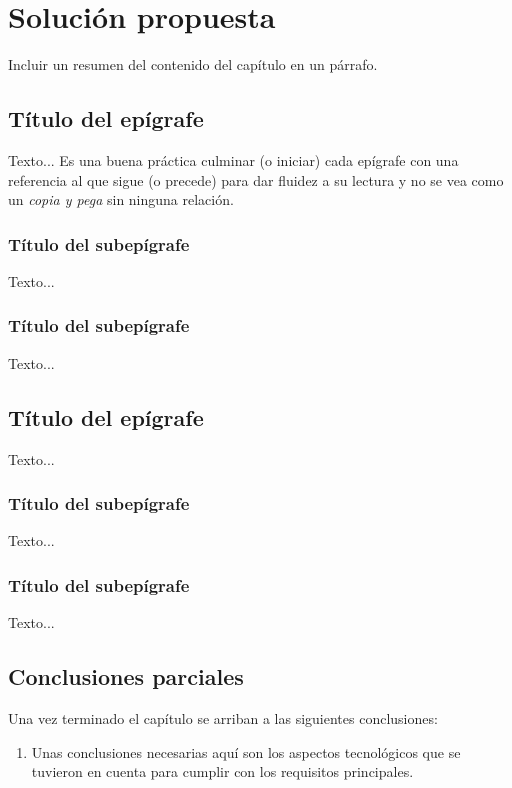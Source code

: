 \chapter{Solución propuesta}\label{chap:2}

Incluir un resumen del contenido del capítulo en un párrafo.\\

\section{Título del epígrafe}

Texto... Es una buena práctica culminar (o iniciar) cada epígrafe con una referencia al que sigue (o precede) para dar fluidez a su lectura y no se vea como un \emph{copia y pega} sin ninguna relación.

\subsection{Título del subepígrafe}

Texto...

\subsection{Título del subepígrafe}

Texto...

\section{Título del epígrafe}

Texto...

\subsection{Título del subepígrafe}

Texto...

\subsection{Título del subepígrafe}

Texto...

\section{Conclusiones parciales}


Una vez terminado el capítulo se arriban a las siguientes conclusiones:

\begin{enumerate}
	\setlength\itemsep{0em}
	\item Unas conclusiones necesarias aquí son los aspectos tecnológicos que se tuvieron en cuenta para cumplir con los requisitos principales.
\end{enumerate}
\pagebreak

